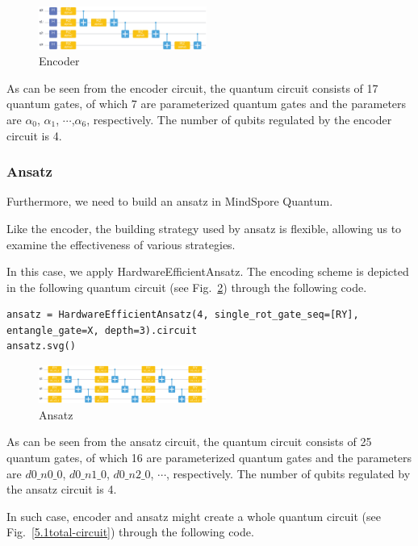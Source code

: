 \begin{figure}[H]
\centering
\includegraphics[width=0.49\textwidth]{5.1_figures/encoder-circuit.eps}
\caption{Encoder}
\label{5.1encoder-circuit}
\end{figure}

As can be seen from the encoder circuit, the quantum circuit consists of 17 quantum gates, of which 7 are 
parameterized quantum gates and the parameters are $\alpha_0$, $\alpha_1$, $\cdots$,$\alpha_6$, respectively. The number of qubits regulated by the encoder circuit is 4.

\subsubsection{Ansatz}
Furthermore, we need to build an ansatz in MindSpore Quantum.

Like the encoder, the building strategy used by ansatz is flexible, allowing us to examine the effectiveness of various strategies.

In this case, we apply HardwareEfficientAnsatz. The encoding scheme is depicted in the following quantum circuit (see Fig.~\ref{5.1ansatz-circuit}) through the following code.

\begin{lstlisting}
ansatz = HardwareEfficientAnsatz(4, single_rot_gate_seq=[RY], entangle_gate=X, depth=3).circuit     
ansatz.svg()
\end{lstlisting}

\begin{figure}[H]
\centering
\includegraphics[width=0.49\textwidth]{5.1_figures/ansatz-circuit.eps}
\caption{Ansatz}
\label{5.1ansatz-circuit}
\end{figure}

As can be seen from the ansatz circuit, the quantum circuit consists of 25 quantum gates, of which 16 are parameterized quantum gates and the parameters are $d0\_n0\_0$, $d0\_n1\_0$, $d0\_n2\_0$, $\cdots$,  respectively. The number of qubits regulated by the ansatz circuit is 4.

In such case, encoder and ansatz might create a whole quantum circuit (see Fig.~\ref{5.1total-circuit}) through the following code.

